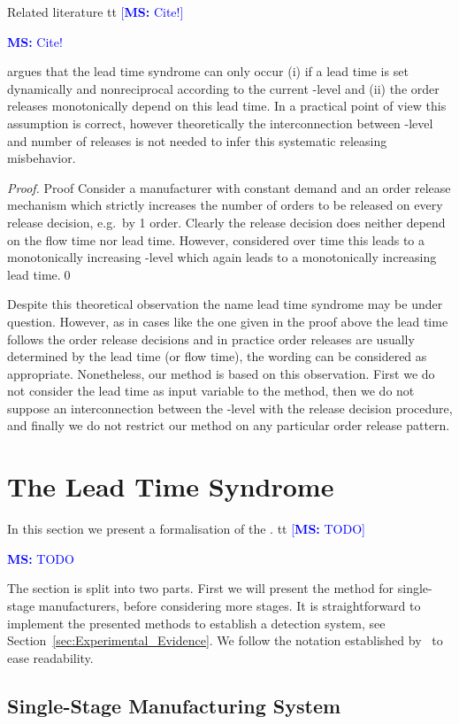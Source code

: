 \documentclass[mnsc]{informs3}
\newcommand\MS[2][r]{\ifx t#1 \textcolor{blue}{[\textbf{MS:} #2]}
  \else \begin{center}\textcolor{blue}{\textbf{MS:} #2} \end{center} \fi}
\begin{document}
Related literature \MS[t]{Cite!} argues that the lead time syndrome can only occur (i) if a lead
time is set dynamically and nonreciprocal according to the current \WIP{}-level and (ii) the order
releases monotonically depend on this lead time. In a practical point of view this assumption is
correct, however theoretically the interconnection between \WIP{}-level and number of releases is
not needed to infer this systematic releasing misbehavior.

\begin{proof}{Proof}
  Consider a manufacturer with constant demand and an order release mechanism which strictly
  increases the number of orders to be released on every release decision, e.g.~by 1 order. Clearly
  the release decision does neither depend on the flow time nor lead time. However, considered over
  time this leads to a monotonically increasing \WIP{}-level which again leads to a monotonically
  increasing lead time.\qed
\end{proof}

Despite this theoretical observation the name lead time syndrome may be under question. However, as
in cases like the one given in the proof above the lead time follows the order release decisions and
in practice order releases are usually determined by the lead time (or flow time), the wording can
be considered as appropriate.
%
Nonetheless, our method is based on this observation. First we do not consider the lead time as
input variable to the method, then we do not suppose an interconnection between the \WIP{}-level
with the release decision procedure, and finally we do not restrict our method on any particular
order release pattern.


\section{The Lead Time Syndrome}
\label{sec:The_Lead_Time_Syndrome}

In this section we present a formalisation of the \LTS{}.
%
\MS[t]{TODO} The section is split into two
parts. First we will present the method for single-stage manufacturers, before considering more
stages.
%
It is straightforward to implement the presented methods to establish a \LTS{} detection system, see
Section~\ref{sec:Experimental_Evidence}. We follow the notation established
by~\cite{selccuk2013adaptive} to ease readability.

\subsection{Single-Stage Manufacturing System}
\label{subsec:Single-Stage_Manufacturing_System}
\end{document}
